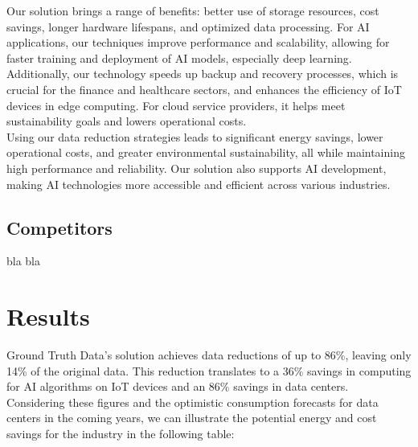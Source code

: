 Our solution brings a range of benefits: better use of storage resources, cost savings, longer hardware lifespans, and optimized data processing. For AI applications, our techniques improve performance and scalability, allowing for faster training and deployment of AI models, especially deep learning.\\

Additionally, our technology speeds up backup and recovery processes, which is crucial for the finance and healthcare sectors, and enhances the efficiency of IoT devices in edge computing. For cloud service providers, it helps meet sustainability goals and lowers operational costs.\\

Using our data reduction strategies leads to significant energy savings, lower operational costs, and greater environmental sustainability, all while maintaining high performance and reliability. Our solution also supports AI development, making AI technologies more accessible and efficient across various industries.

\subsection{Competitors}
bla bla

\section{Results}

Ground Truth Data's solution achieves data reductions of up to 86\%, leaving only 14\% of the original data. This reduction translates to a 36\% savings in computing for AI algorithms on IoT devices and an 86\% savings in data centers.\\


Considering these figures and the optimistic consumption forecasts for data centers in the coming years, we can illustrate the potential energy and cost savings for the industry in the following table:

